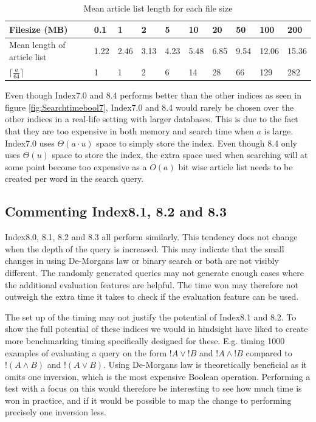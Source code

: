 \begin{table}[H]
\centering
\begin{tabular}{l|lllllllll}
 Filesize (MB)                           & 0.1 & 1     & 2      & 5      & 10 & 20     & 50     & 100 & 200 \\
 \hline 
Mean length of article list &  1.22   & 2.46     & 3.13      & 4.23      & 5.48      &  6.85     &  9.54    &  12.06      &  15.36      \\
  $\lceil \frac{a}{64} \rceil$                          &  1      & 1        & 2         &  6        & 14      &  28       &  66     & 129     &  282    
\end{tabular}
\caption{Mean article list length for each file size}
\label{tab:MeanArticlelengh_a26}
\end{table}

Even though Index7.0 and 8.4 performs better than the other indices as seen in figure \ref{fig:Searchtimebool7}, Index7.0 and 8.4 would rarely be chosen over the other indices in a real-life setting with larger databases. This is due to the fact that they are too expensive in both memory and search time when $a$ is large. Index7.0 uses $\Theta(a\cdot u)$ space to simply store the index. Even though 8.4 only uses $\Theta(u)$ space to store the index, the extra space used when searching will at some point become too expensive as a $O(a)$ bit wise article list needs to be created per word in the search query.

\subsection{Commenting Index8.1, 8.2 and 8.3}

Index8.0, 8.1, 8.2 and 8.3 all perform similarly. This tendency does not change when the depth of the query is increased. This may indicate that the small changes in using De-Morgans law or binary search or both are not visibly different. The randomly generated queries may not generate enough cases where the additional evaluation features are helpful. The time won may therefore not outweigh the extra time it takes to check if the evaluation feature can be used. 

The set up of the timing may not justify the potential of Index8.1 and 8.2. To show the full potential of these indices we would in hindsight have liked to create more benchmarking timing specifically designed for these. E.g. timing 1000 examples of evaluating a query on the form $!A \vee ! B$ and $!A \wedge ! B$  compared to $!(A \wedge B)$ and $!(A \vee B)$. Using De-Morgans law is theoretically beneficial as it omits one inversion, which is the most expensive Boolean operation. Performing a test with a focus on this would therefore be interesting to see how much time is won in practice, and if it would be possible to map the change to performing precisely one inversion less.

